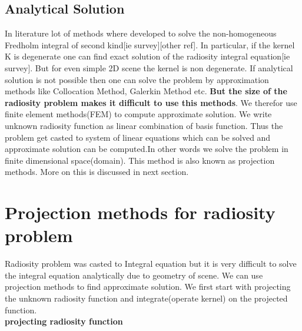 \documentclass[12pt]{article}
\begin{document}
\subsection{Analytical Solution}
In literature lot of methods where developed to solve the non-homogeneous Fredholm integral of second kind[ie survey][other ref]. In particular, if the kernel K is degenerate one can find exact solution of the radiosity integral equation[ie survey]. But for even simple 2D scene the kernel is non degenerate. If analytical solution is not possible then one can solve the problem by approximation methods like Collocation Method, Galerkin Method etc. {\bf But the size of the radiosity problem makes it difficult to use this methods}. We therefor use finite element methods(FEM) to compute approximate solution. We write unknown radiosity function as linear combination of basis function. Thus the problem get casted to system of linear equations which can be solved and approximate solution can be computed.In other words we solve the problem in finite dimensional space(domain). This method is also known as projection methods. More on this is discussed in next section.



\section{Projection methods for radiosity problem}
Radiosity problem was casted to Integral equation but it is very difficult to solve the integral equation analytically due to geometry of scene. We can use projection methods to find approximate solution. We first start with projecting the unknown radiosity function and integrate(operate kernel) on the projected function.\\

{\bf projecting radiosity function}
\end{document}
